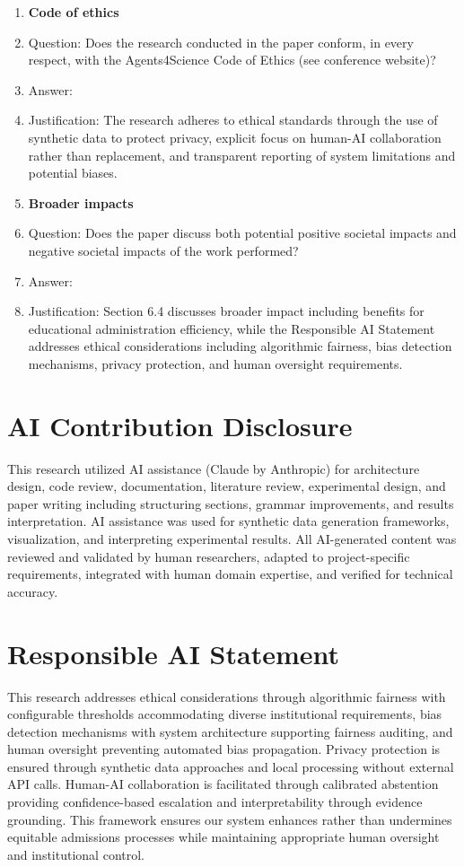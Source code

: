 \documentclass{article}
\begin{document}
\begin{enumerate}
\item {\bf Code of ethics}
    \item[] Question: Does the research conducted in the paper conform, in every respect, with the Agents4Science Code of Ethics (see conference website)?
    \item[] Answer: \answerYes{}
    \item[] Justification: The research adheres to ethical standards through the use of synthetic data to protect privacy, explicit focus on human-AI collaboration rather than replacement, and transparent reporting of system limitations and potential biases.

\item {\bf Broader impacts}
    \item[] Question: Does the paper discuss both potential positive societal impacts and negative societal impacts of the work performed?
    \item[] Answer: \answerYes{}
    \item[] Justification: Section 6.4 discusses broader impact including benefits for educational administration efficiency, while the Responsible AI Statement addresses ethical considerations including algorithmic fairness, bias detection mechanisms, privacy protection, and human oversight requirements.

\end{enumerate}

\section*{AI Contribution Disclosure}
This research utilized AI assistance (Claude by Anthropic) for architecture design, code review, documentation,
literature review, experimental design, and paper writing including structuring sections, grammar improvements,
and results interpretation. AI assistance was used for synthetic data generation frameworks, visualization, and
interpreting experimental results. All AI-generated content was reviewed and validated by human researchers,
adapted to project-specific requirements, integrated with human domain expertise, and verified for technical
accuracy.

\section*{Responsible AI Statement}
This research addresses ethical considerations through algorithmic fairness with configurable thresholds
accommodating diverse institutional requirements, bias detection mechanisms with system architecture
supporting fairness auditing, and human oversight preventing automated bias propagation. Privacy protection is
ensured through synthetic data approaches and local processing without external API calls. Human-AI
collaboration is facilitated through calibrated abstention providing confidence-based escalation and
interpretability through evidence grounding. This framework ensures our system enhances rather than
undermines equitable admissions processes while maintaining appropriate human oversight and institutional
control.
\end{document}
